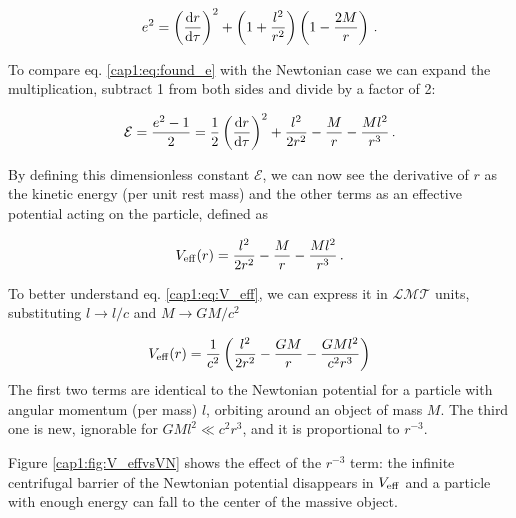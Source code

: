 \begin{equation}
    e^2 = \left(\dv{r}{\tau}\right)^2 + \left(1 + \frac{l^2}{r^2}\right)
    \left(1 - \frac{2M}{r} \right) \, .
   \label{cap1:eq:found_e}
\end{equation}

To compare eq. \ref{cap1:eq:found_e} with the Newtonian case we can expand
the multiplication, subtract 1 from both sides and divide by a factor of 2:

\begin{equation}
    \mathcal E = \frac{e^2 - 1}{2} = \frac{1}{2} \left(\dv{r}{\tau}\right)^2
    + \frac{l^2}{2 r^2} - \frac{M}{r} - \frac{M l^2}{r^3} \, .
    \label{cap1:eq:found_epsilon}
\end{equation}

By defining this dimensionless constant $\mathcal E$, we can now see the
derivative of $r$ as the kinetic energy (per unit rest mass) and the other
terms as an effective potential acting on the particle, defined as

\begin{equation}
    V_{\rm eff}(r) = \frac{l^2}{2 r^2} - \frac{M}{r} - \frac{M l^2}{r^3} \, .
    \label{cap1:eq:V_eff}
\end{equation}

To better understand eq. \ref{cap1:eq:V_eff}, we can express it in
$\mathcal{LMT}$ units, substituting $l \rightarrow l / c$ and 
$ M \rightarrow G M / c^2$

\begin{equation*}
    V_{\rm eff}(r)
    = \frac{1}{c^2} \left( \frac{l^2}{2 r^2} - \frac{G M}{r}
    - \frac{G M l^2}{c^2 r^3} \right)
\end{equation*}
The first two terms are identical to the Newtonian potential for a particle
with angular momentum (per mass) $l$, orbiting around an object of mass $M$.
The third one is new, ignorable for $GMl^2 \ll c^2 r^3$, and it is proportional
to $r^{-3}$.

Figure \ref{cap1:fig:V_effvsVN} shows the effect of the $r^{-3}$ term: the
infinite centrifugal barrier of the Newtonian potential disappears in
$V_{\rm eff}$ and a particle with enough energy can fall to the center of the
massive object.

